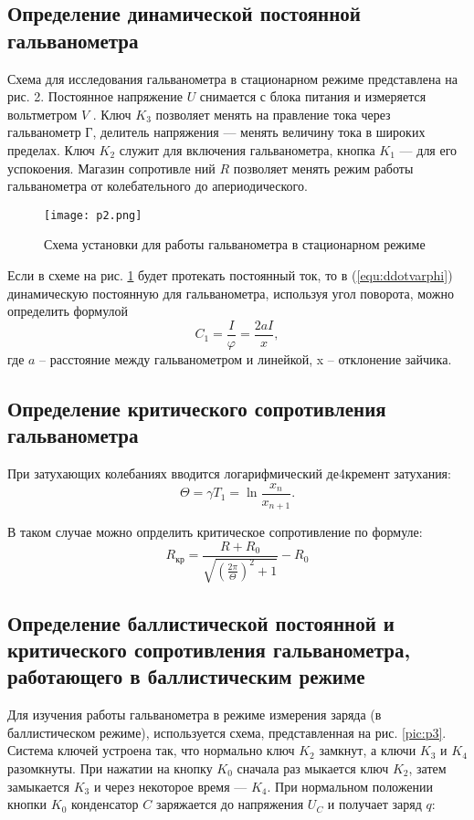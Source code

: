 \subsection{Определение динамической постоянной гальванометра}

Схема для исследования гальванометра в стационарном режиме представлена на рис. 2. Постоянное напряжение $U$ снимается с блока питания и измеряется вольтметром $V$ . Ключ $K_3$ позволяет менять на­ правление тока через гальванометр Г, делитель напряжения — менять величину тока в широких пределах. Ключ $K_2$ служит для включения гальванометра, кнопка $K_1$ — для его успокоения. Магазин сопротивле­ ний $R$ позволяет менять режим работы гальванометра от колебательно­го до апериодического.

\begin{figure}[h]
    \centering
    \texttt{[image: p2.png]}
    \caption{Схема установки для работы гальванометра в стационарном режиме}
    \label{pic:p2}
\end{figure}

Если в схеме на рис. \ref{pic:p2} будет протекать постоянный ток, то в (\ref{equ:ddotvarphi}) динамическую постоянную для гальванометра, используя угол поворота, можно определить формулой
\begin{equation}
    C_1 = \frac I \varphi = \frac{2aI}{x},
    \label{equ:C_1}
\end{equation}
где $a$ -- расстояние между гальванометром и линейкой, x -- отклонение зайчика.

\subsection{Определение критического сопротивления гальванометра}

При затухающих колебаниях вводится логарифмический де4кремент затухания:
\begin{equation}
    \Theta = \gamma T_1 = \ln\frac {x_n} {x_{n+1}}.
    \label{equ:Theta}
\end{equation}

В таком случае можно опрделить критическое сопротивление по формуле:
\begin{equation}
    R_\text{кр} = \frac{R+R_0}{\sqrt{\left(\frac{2\pi}{\Theta}\right)^2 + 1}} - R_0
    \label{equ:Rkr}
\end{equation}

\subsection{Определение баллистической постоянной и критического сопротивления гальванометра, работающего в баллистическим режиме}
Для изучения работы гальванометра в режиме измерения заряда (в баллистическом режиме), используется схема, представленная на рис. \ref{pic:p3}. Система ключей устроена так, что нормально ключ $K_2$ замкнут, а ключи $K_3$ и $K_4$ разомкнуты. При нажатии на кнопку $K_0$ сначала раз­ мыкается ключ $K_2$, затем замыкается $K_3$ и через некоторое время — $K_4$. При нормальном положении кнопки $K_0$ конденсатор $C$ заряжается до напряжения $U_C$ и получает заряд $q$:

